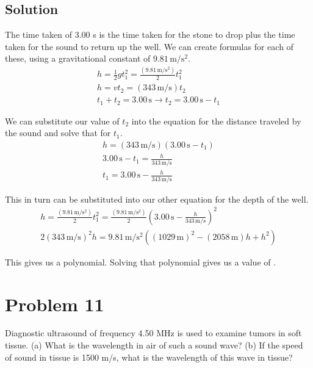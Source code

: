 \documentclass[12pt]{article}
\begin{document}
        \subsection{Solution}
            The time taken of 3.00 s is the time taken for the stone to drop plus the time taken for the sound to return up the well.
            We can create formulas for each of these, using a gravitational constant of $9.81\,\unit{\meter/\second^2}$.
            \begin{gather}
                h   =   \frac{1}{2}gt_1^2
                    =   \frac{(9.81\,\unit{\meter/\second^2})}{2} t_1^2\\
                h   =   vt_2
                    =   (343\,\unit{\meter/\second})t_2\\
                t_1 + t_2   =   3.00\,\unit{\second} \to
                t_2 =   3.00\,\unit{\second} - t_1
            \end{gather}

            We can substitute our value of $t_2$ into the equation for the distance traveled by the sound and solve that for $t_1$.
            \begin{gather}
                h   =   (343\,\unit{\meter/\second}) (3.00\,\unit{\second} - t_1)\\
                3.00\,\unit{\second} - t_1  =   \frac{h}{343\,\unit{\meter/\second}}\\
                t_1 =   3.00\,\unit{\second} - \frac{h}{343\,\unit{\meter/\second}}
            \end{gather}

            This in turn can be substituted into our other equation for the depth of the well.
            \begin{gather}
                h   =   \frac{(9.81\,\unit{\meter/\second^2})}{2} t_1^2
                    =   \frac{(9.81\,\unit{\meter/\second^2})}{2} \left( 3.00\,\unit{\second} - \frac{h}{343\,\unit{\meter/\second}} \right)^2\\
                2 (343\,\unit{\meter/\second})^2 h  =   9.81\,\unit{\meter/\second^2} \left( (1029\,\unit{\meter})^2 - (2058\,\unit{\meter})h + h^2 \right)
            \end{gather}

            This gives us a polynomial.
            Solving that polynomial gives us a value of .

    \pagebreak
    \section{Problem 11}
        Diagnostic ultrasound of frequency 4.50 MHz is used to examine tumors in soft tissue. 
        (a) What is the wavelength in air of such a sound wave? 
        (b) If the speed of sound in tissue is 1500 m/s, what is the wavelength of this wave in tissue?
\end{document}
